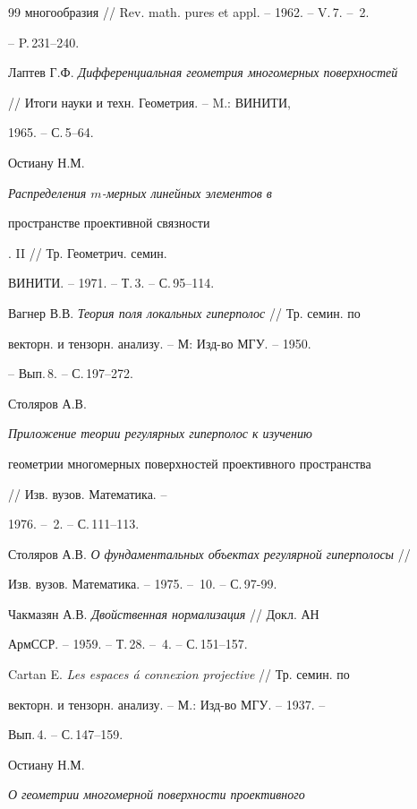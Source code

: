 \begin{thebibliography}{99}
{многообразия} // Rev. math. pures et appl. -- 1962. -- V.\,7. -- \No\,2. 


-- P.\,231--240. 




Лаптев Г.Ф. {\em Дифференциальная геометрия многомерных поверхностей} 


// Итоги науки и техн. Геометрия. -- M.: ВИНИТИ,


1965. -- С.\,5--64. 




Остиану Н.М. {\em Распределения $m$-мерных линейных элементов в 


пространстве проективной связности}. II // Тр. Геометрич. семин. 


ВИНИТИ. -- 1971. -- Т.\,3. -- С.\,95--114. 




Вагнер В.В. {\em Теория поля локальных гиперполос} // Тр. семин. по 


векторн. и тензорн. анализу. -- М: Изд-во МГУ. -- 1950. 


-- Вып.\,8. -- С.\,197--272. 




Столяров А.В. {\em Приложение теории регулярных гиперполос к изучению 


геометрии многомерных поверхностей проективного пространства} 


// Изв. вузов. Математика. -- 


1976. -- \No\,2. -- С.\,111--113. 




Столяров А.В. {\em О фундаментальных объектах регулярной гиперполосы} // 


Изв. вузов. Математика. -- 1975. -- \No\,10. -- С.\,97-99. 




Чакмазян А.В. {\em Двойственная нормализация} // Докл. АН 


АрмССР. -- 1959. -- Т.\,28. -- \No\,4. -- С.\,151--157. 




Cartan E. {\em Les espaces \'a connexion projective} // Тр. семин. по 


векторн. и тензорн. анализу. -- М.: Изд-во МГУ. -- 1937. -- 


Вып.\,4. -- С.\,147--159. 




Остиану Н.М. {\em О геометрии многомерной поверхности проективного 


}
\end{thebibliography}
